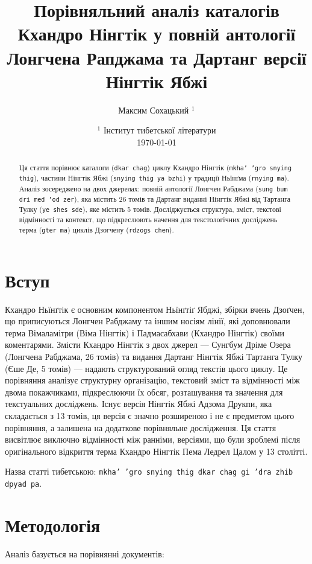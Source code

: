 \documentclass{article}
\title{  Порівняльний аналіз
         каталогів Кхандро Нінгтік
         у повній антології Лонгчена Рапджама
         та Дартанг версії Нінгтік Ябжі}
\author{ Максим Сохацький $^1$ }
\date{   $^1$ Інститут тибетської літератури \\
         \today }
\begin{document}
\maketitle

\begin{abstract}
Ця стаття порівнює каталоги (\texttt{dkar chag}) циклу Кхандро Нінгтік (\texttt{mkha' 'gro snying thig}),
частини Нінгтік Ябжі (\texttt{snying thig ya bzhi}) у традиції Ньїнґма (\texttt{rnying ma}). Аналіз зосереджено на двох
джерелах: повній антології Лонгчен Рабджама (\texttt{sung bum dri med 'od zer}), яка містить 26 томів
та Дартанг виданні Нінгтік Ябжі від Тартанга Тулку (\texttt{ye shes sde}), яке містить 5 томів.
Досліджується структура, зміст, текстові відмінності та контекст, що підкреслюють
начення для текстологічних досліджень терма (\texttt{gter ma}) циклів Дзогчену (\texttt{rdzogs chen}).
\end{abstract}


\newpage
\tableofcontents

\newpage

\section{Вступ}

Кхандро Ньїнґтік є основним компонентом Ньїнґтіґ Ябджі, збірки вчень Дзоґчен,
що приписуються Лонгчен Рабджаму та іншим носіям лінії, які доповнювали терма
Вімаламітри (Віма Нінгтік) і Падмасабхави (Кхандро Нінгтік) своїми коментарями.
Змісти Кхандро Нінгтік з двох джерел — Сунгбум Дріме Озера (Лонгчена Рабджама, 26 томів) та видання
Дартанг Нінгтік Ябжі Тартанга Тулку (Єше Де, 5 томів) — надають структурований огляд текстів цього циклу.
Це порівняння аналізує структурну організацію, текстовий зміст та відмінності між
двома покажчиками, підкреслюючи їх обсяг, розташування та значення для текстуальних досліджень.
Існує версія Нінгтік Ябжі Адзома Друкпи, яка складається з 13 томів, ця версія є значно розширеною
і не є предметом цього порівняння, а залишена на додаткове порівняльне дослідження. Ця стаття
висвітлює виключно відмінності між ранніми, версіями, що були зроблемі після оригінального відкриття
терма Кхандро Нінгтік Пема Ледрел Цалом у 13 столітті.

Назва статті тибетською: \texttt{mkha' 'gro snying thig dkar chag gi 'dra zhib dpyad pa}.

\section{Методологія}
Аналіз базується на порівнянні документів:
\end{document}
